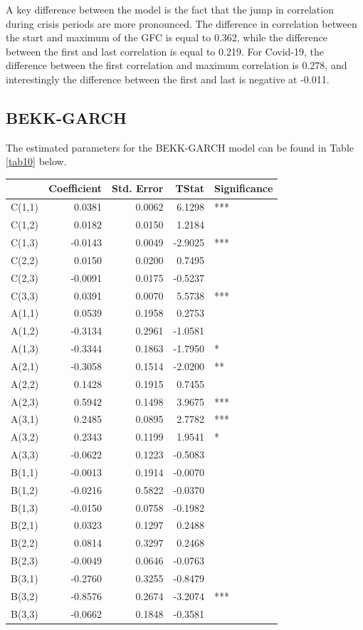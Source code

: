 \documentclass[11pt,preprint, authoryear]{elsarticle}
\let\origtable\table
\let\endorigtable\endtable
\renewenvironment{table}[1][2] {
    \expandafter\origtable\expandafter[H]
} {
    \endorigtable
}
\numberwithin{equation}{section}
\numberwithin{figure}{section}
\numberwithin{table}{section}
\begin{document}
A key difference between the model is the fact that the jump in
correlation during crisis periods are more pronounced. The difference in
correlation between the start and maximum of the GFC is equal to 0.362,
while the difference between the first and last correlation is equal to
0.219. For Covid-19, the difference between the first correlation and
maximum correlation is 0.278, and interestingly the difference between
the first and last is negative at -0.011.

\hypertarget{bekk-garch-1}{%
\subsection{BEKK-GARCH}\label{bekk-garch-1}}

The estimated parameters for the BEKK-GARCH model can be found in Table
\ref{tab10} below.

\begin{table}[H]
\centering
\caption{BEKK-GARCH Results \label{tab10}} 
\begin{tabular}{lrrrl}
  \hline
  & Coefficient & Std. Error & TStat & Significance \\ 
  \hline
C(1,1) & 0.0381 & 0.0062 & 6.1298 & *** \\ 
  C(1,2) & 0.0182 & 0.0150 & 1.2184 &  \\ 
  C(1,3) & -0.0143 & 0.0049 & -2.9025 & *** \\ 
  C(2,2) & 0.0150 & 0.0200 & 0.7495 &  \\ 
  C(2,3) & -0.0091 & 0.0175 & -0.5237 &  \\ 
  C(3,3) & 0.0391 & 0.0070 & 5.5738 & *** \\ 
  A(1,1) & 0.0539 & 0.1958 & 0.2753 &  \\ 
  A(1,2) & -0.3134 & 0.2961 & -1.0581 &  \\ 
  A(1,3) & -0.3344 & 0.1863 & -1.7950 & * \\ 
  A(2,1) & -0.3058 & 0.1514 & -2.0200 & ** \\ 
  A(2,2) & 0.1428 & 0.1915 & 0.7455 &  \\ 
  A(2,3) & 0.5942 & 0.1498 & 3.9675 & *** \\ 
  A(3,1) & 0.2485 & 0.0895 & 2.7782 & *** \\ 
  A(3,2) & 0.2343 & 0.1199 & 1.9541 & * \\ 
  A(3,3) & -0.0622 & 0.1223 & -0.5083 &  \\ 
  B(1,1) & -0.0013 & 0.1914 & -0.0070 &  \\ 
  B(1,2) & -0.0216 & 0.5822 & -0.0370 &  \\ 
  B(1,3) & -0.0150 & 0.0758 & -0.1982 &  \\ 
  B(2,1) & 0.0323 & 0.1297 & 0.2488 &  \\ 
  B(2,2) & 0.0814 & 0.3297 & 0.2468 &  \\ 
  B(2,3) & -0.0049 & 0.0646 & -0.0763 &  \\ 
  B(3,1) & -0.2760 & 0.3255 & -0.8479 &  \\ 
  B(3,2) & -0.8576 & 0.2674 & -3.2074 & *** \\ 
  B(3,3) & -0.0662 & 0.1848 & -0.3581 &  \\ 
   \hline
\end{tabular}
\end{table}
\end{document}
